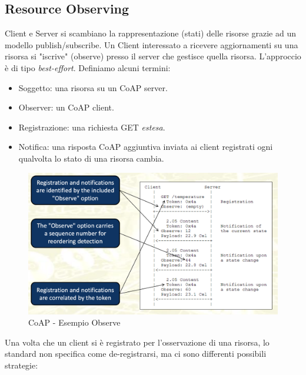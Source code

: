 \documentclass{article}
\begin{document}
\subsection{Resource Observing}
Client e Server si scambiano la rappresentazione (stati) delle risorse grazie ad un modello publish/subscribe. Un Client interessato a ricevere aggiornamenti su una risorsa si "iscrive" (observe) presso il server che gestisce quella risorsa. L'approccio è di tipo \textit{best-effort}. Definiamo alcuni termini:
\begin{itemize}
    \item Soggetto: una risorsa su un CoAP server.
    \item Observer: un CoAP client.
    \item Registrazione: una richiesta GET \textit{estesa}.
    \item Notifica: una risposta CoAP aggiuntiva inviata ai client registrati ogni qualvolta lo stato di una risorsa cambia.
\end{itemize}
\begin{figure}[H]
\centering
\includegraphics[scale=0.4]{figures/esempio observe.png}
\caption{CoAP - Esempio Observe}
\end{figure}
Una volta che un client si è registrato per l'osservazione di una risorsa, lo standard non specifica come de-registrarsi, ma ci sono differenti possibili strategie:
\end{document}
